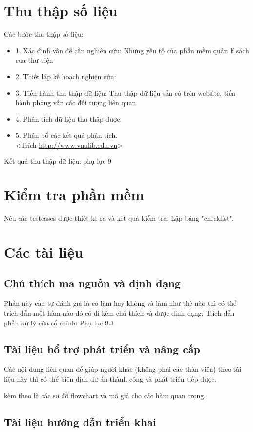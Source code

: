 \documentclass[a4paper]{article}
\begin{document}
\section{Thu thập số liệu}
Các bước thu thập số liệu:\\
\begin{itemize}
\item 1. Xác định vấn đề cần nghiên cứu: Những yếu tố của phần mềm quản lí sách cua thư viện
\item 2. Thiết lập kế hoạch nghiên cứu:
\item 3. Tiến hành thu thập dữ liệu: Thu thập dữ liệu sẵn có trên website, tiến hành phỏng vấn các đối tượng liên quan
\item 4. Phân tích dữ liệu thu thập được.
\item 5. Phân bổ các kết quả phân tích.\\
<Trích \url{http://www.vnulib.edu.vn}>
\end{itemize}
Kết quả thu thập dữ liệu: phụ lục 9\\
\section{Kiểm tra phần mềm}
Nêu các testcases được thiết kế ra và kết quả kiểm tra. Lập bảng "checklist".

\section{Các tài liệu}
\subsection{Chú thích mã nguồn và định dạng}
Phần này cần tự đánh giá là có làm hay không và làm như thế nào thì có thể trích dẫn một hàm nào đó có đi kèm chú thích và được định dạng.
Trích dẫn phần xử lý cửa sổ chính: Phụ lục 9.3\\
\subsection{Tài liệu hổ trợ phát triển và nâng cấp}
Các nội dung liên quan để giúp người khác (không phải các thàn viên) theo tài liệu này thì có thể biên dịch dự án thành công và phát triển tiếp được.


kèm theo là các sơ đồ flowchart và mã giả cho các hàm quan trọng.

\subsection{Tài liệu hướng dẫn triển khai}
\end{document}
